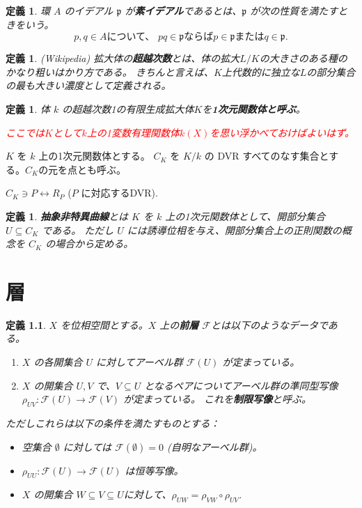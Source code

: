 \documentclass[uplatex, 12pt, dvipdfmx]{jsreport}
\newtheorem{dfn}[thm]{定義}
\newcommand{\mfp}{\mathfrak{p}}
\newcommand{\mcF}{\mathcal{F}}
\begin{document}
\begin{dfn}
    環 $A$ のイデアル $\mfp$ が\textbf{素イデアル}であるとは、$\mfp$ が次の性質を満たすときをいう。
    \[
        p, q \in A \text{について、\ } pq \in \mfp \text{ならば} p \in \mfp \text{または} q \in \mfp.
    \]
\end{dfn}

\begin{dfn}
    (Wikipedia) 拡大体の{\bf 超越次数}とは、体の拡大$L/K$の大きさのある種のかなり粗いはかり方である。
    きちんと言えば、$K$上代数的に独立な$L$の部分集合の最も大きい濃度として定義される。
\end{dfn}

\begin{dfn}
体 $k$ の超越次数1の有限生成拡大体$K$を{\bf 1次元関数体と呼ぶ}。

\textcolor{red}{ここでは$K$として$k$上の1変数有理関数体$k(X)$を思い浮かべておけばよいはず。}
\end{dfn}

$K$ を $k$ 上の1次元関数体とする。
$C_K$ を $K/k$ の DVR すべてのなす集合とする。$C_K$の元を点とも呼ぶ。
\begin{center}
    $C_K \ni P \leftrightarrow R_P$ ($P$ に対応するDVR).
\end{center}

\begin{dfn}
    {\bf 抽象非特異曲線}とは $K$ を $k$ 上の1次元関数体として、開部分集合 $U \subseteq C_K$ である。
    ただし $U$ には誘導位相を与え、開部分集合上の正則関数の概念を $C_K$ の場合から定める。
\end{dfn}

\chapter{層}

\begin{dfn}
    $X$ を位相空間とする。$X$ 上の\textbf{前層} $\mcF$とは以下のようなデータである。
    \begin{enumerate}
        \item $X$ の各開集合 $U$ に対してアーベル群 $\mcF(U)$ が定まっている。
        \item $X$ の開集合 $U, V$ で、$V \subseteq U$ となるペアについてアーベル群の準同型写像
        $\rho_{UV}: \mcF(U) \to \mcF(V)$ が定まっている。 これを\textbf{制限写像}と呼ぶ。
    \end{enumerate}
    ただしこれらは以下の条件を満たすものとする：
    \begin{itemize}
        \item 空集合 $\emptyset$ に対しては $\mcF(\emptyset) = 0$ (自明なアーベル群)。
        \item $\rho_{UU}: \mcF(U) \to \mcF(U)$ は恒等写像。
        \item $X$ の開集合 $W \subseteq V \subseteq U$に対して、$\rho_{UW} = \rho_{VW}\circ\rho_{UV}$.
    \end{itemize}
\end{dfn}
\end{document}

